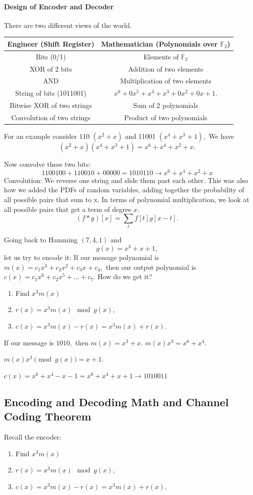 \documentclass[12pt]{article}
\begin{document}
\paragraph{Design of Encoder and Decoder}

There are two different views of the world.


\begin{tabular}{c|c}
Engineer (Shift Register)&Mathematician (Polynomials over $\mathbb{F}_2$)\\
\hline
Bits (0/1)&Elements of $\mathbb{F}_2$\\
XOR of 2 bits & Addition of two elements\\
AND & Multiplication of two elements\\
String of bits (1011001)&$x^6+0x^5+x^4+x^3+0x^2+0x+1.$\\
Bitwise XOR of two strings & Sum of 2 polynomials\\
Convolution of two strings & Product of two polynomials
\end{tabular}

For an example consider 110 $(x^2+x)$ and 11001 $(x^4+x^3+1),$
We have
\[(x^2+x)(x^4+x^3+1)=x^6+x^4+x^2+x.\]

Now convolve these two bits:
\[1100100+110010+00000=1010110\to x^6+x^4+x^2+x\]
Convolution: We reverse one string and slide them past each other. This was also how we added the PDFs of random variables, adding together the probability of all possible pairs that sum to x. In terms of polynomial multiplication, we look at all possible pairs that get a term of degree $x$.
\[
(f \ast g)[x]= \sum_t f[t] g[x-t].
\]

Going back to Hamming $(7,4,1)$ and
\[g(x)=x^3+x+1,\]
let us try to encode it:
If our message polynomial is
$m(x)=c_1x^3+c_2x^2+c_3x+c_4,$
then our output polynomial is
$c(x)=c_1x^6+c_2x^5+\dots+c_7.$
How do we get it?

\begin{enumerate}
\item Find $x^3 m(x)$
\item $r(x)=x^3m(x)\mod g(x),$
\item $c(x)=x^3m(x)-r(x)=x^3m(x)+r(x).$
\end{enumerate}

If our message is $1010,$ then $m(x)=x^3+x.$
$m(x)x^3=x^6+x^4.$

$m(x)x^3\pmod{g(x)}=x+1.$

$c(x)=x^6+x^4-x-1=x^6+x^4+x+1\to 1010011$
\subsection{Encoding and Decoding Math and Channel Coding Theorem}
Recall the encoder:
\begin{enumerate}
\item Find $x^3 m(x)$
\item $r(x)=x^3m(x)\mod g(x),$
\item $c(x)=x^3m(x)-r(x)=x^3m(x)+r(x).$
\end{enumerate}
\end{document}
